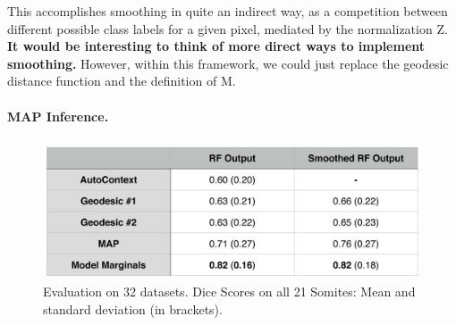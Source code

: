 \documentclass[10pt,twocolumn,letterpaper]{article}
\begin{document}
This accomplishes smoothing in quite an indirect way, as a competition between different possible class labels for a given pixel, mediated by the normalization Z.  \textbf{It would be interesting to think of more direct ways to implement smoothing.}  However, within this framework, we could just replace the geodesic distance function and the definition of M.


\paragraph{MAP Inference. }

\begin{figure}[t]
\begin{center}
\includegraphics[width=\columnwidth]{TableDiceScores.jpg} %
\caption{Evaluation on 32 datasets. Dice Scores on all 21 Somites: Mean and standard deviation (in brackets).}
\label{tab:results}
\end{center}
\end{figure}
\end{document}
